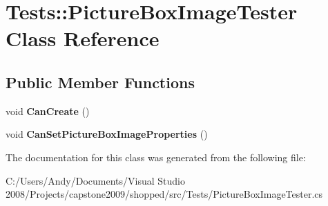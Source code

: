 \hypertarget{class_tests_1_1_picture_box_image_tester}{
\section{Tests::PictureBoxImageTester Class Reference}
\label{class_tests_1_1_picture_box_image_tester}
}
\subsection*{Public Member Functions}
\begin{DoxyCompactItemize}
\item 
\hypertarget{class_tests_1_1_picture_box_image_tester_a06d878583fb2603dc081802ee581a6f2}{
void {\bfseries CanCreate} ()}
\label{class_tests_1_1_picture_box_image_tester_a06d878583fb2603dc081802ee581a6f2}

\item 
\hypertarget{class_tests_1_1_picture_box_image_tester_ac56c0c43888757c672917fe9080bac9b}{
void {\bfseries CanSetPictureBoxImageProperties} ()}
\label{class_tests_1_1_picture_box_image_tester_ac56c0c43888757c672917fe9080bac9b}

\end{DoxyCompactItemize}


The documentation for this class was generated from the following file:\begin{DoxyCompactItemize}
\item 
C:/Users/Andy/Documents/Visual Studio 2008/Projects/capstone2009/shopped/src/Tests/PictureBoxImageTester.cs\end{DoxyCompactItemize}
